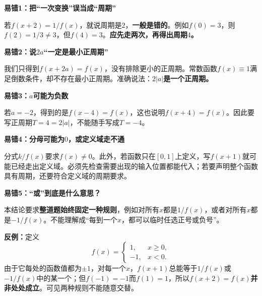 \clearpage
\begin{trapbox}
\textbf{\textcolor{CTrap}{易错1：把“一次变换”误当成“周期”}}



若$f(x+2)=1/f(x)$，就说周期是$2$，\textbf{一般是错的}。例如$f(0)=3$，则$f(2)=1/3\ne3$，但$f(4)=3$。\textbf{应先走两次，再得出周期$4$。}

\medskip

\end{trapbox}
\clearpage
\begin{trapbox}
\textbf{\textcolor{CTrap}{易错2：说$2a$“一定是最小正周期”}}



我们只得到$f(x+2a)=f(x)$，没有排除更小的正周期。常数函数$f(x)\equiv1$满足倒数条件，却不存在最小正周期。准确说法：\textbf{$2|a|$是一个正周期。}

\medskip

\end{trapbox}
\clearpage
\begin{trapbox}
\textbf{\textcolor{CTrap}{易错3：$a$可能为负数}}



若$a=-2$，得到的是$f(x-4)=f(x)$，这也说明$f(x+4)=f(x)$。因此要写正周期$T=4=2|a|$，不能随手写成$T=-4$。

\medskip

\end{trapbox}
\clearpage
\begin{trapbox}
\textbf{\textcolor{CTrap}{易错4：分母可能为$0$，或定义域走不通}}



分式$k/f(x)$要求$f(x)\ne0$。此外，若函数只在$[0,1]$上定义，写$f(x+1)$就可能已经走出定义域。必须先检查需要出现的输入位置都能代入；若要声明整个函数具有周期，还要符合定义域的周期要求。



\medskip

\end{trapbox}
\clearpage
\begin{trapbox}
\textbf{\textcolor{CTrap}{易错5：“或”到底是什么意思？}}



本结论要求\textbf{整道题始终固定一种规则}，例如对所有$x$都是$1/f(x)$，或者对所有$x$都是$-1/f(x)$。不能理解成“每到一个$x$，都可以临时任选正号或负号”。

\textbf{反例：}定义
\[
 f(x)=\begin{cases}1,&x\ge0,\\-1,&x<0.\end{cases}
\]
由于它每处的函数值都为$\pm1$，对每一个$x$，$f(x+1)$总能等于$1/f(x)$或$-1/f(x)$中的某一个；但$f(-1)=-1$而$f(1)=1$，所以$f(x+2)=f(x)$\textbf{并非处处成立}。可见两种规则不能随意交替。

\medskip

\end{trapbox}
